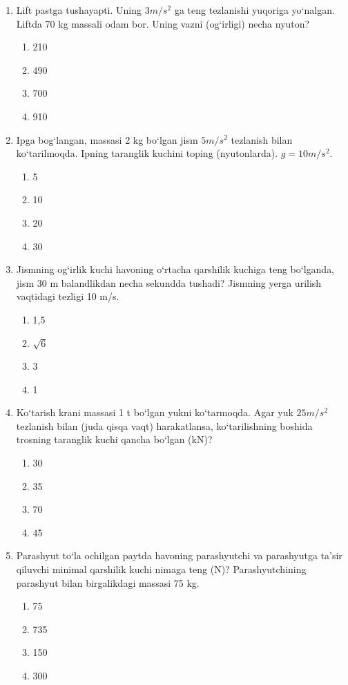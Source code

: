 \begin{enumerate}
\item Lift pastga tushayapti. Uning $3 m/s^2$ ga teng tezlanishi yuqoriga yo‘nalgan. Liftda 70 kg massali odam bor. Uning vazni (og‘irligi) necha nyuton?
\begin{enumerate}[label=\Alph*)]
\item 210
\item 490
\item 700
\item 910
\end{enumerate}

\item Ipga bog‘langan, massasi 2 kg bo‘lgan jism $5 m/s^2$ tezlanish bilan ko‘tarilmoqda. Ipning taranglik kuchini toping (nyutonlarda). $g=10 m/s^2$.
\begin{enumerate}[label=\Alph*)]
\item 5
\item 10
\item 20
\item 30
\end{enumerate}

\item Jismning og‘irlik kuchi havoning o‘rtacha qarshilik kuchiga teng bo‘lganda, jism 30 m balandlikdan necha sekundda tushadi? Jismning yerga urilish vaqtidagi tezligi 10 m/s.
\begin{enumerate}[label=\Alph*)]
\item 1,5
\item $\sqrt{6}$
\item 3
\item 1
\end{enumerate}

\item Ko‘tarish krani massasi 1 t bo‘lgan yukni ko‘tarmoqda. Agar yuk $25 m/s^2$ tezlanish bilan (juda qisqa vaqt) harakatlansa, ko‘tarilishning boshida trosning taranglik kuchi qancha bo‘lgan (kN)?
\begin{enumerate}[label=\Alph*)]
\item 30
\item 35
\item 70
\item 45
\end{enumerate}

\item Parashyut to‘la ochilgan paytda havoning parashyutchi va parashyutga ta’sir qiluvchi minimal qarshilik kuchi nimaga teng (N)? Parashyutchining parashyut bilan birgalikdagi massasi 75 kg.
\begin{enumerate}[label=\Alph*)]
\item 75
\item 735
\item 150
\item 300
\end{enumerate}


\end{enumerate}
